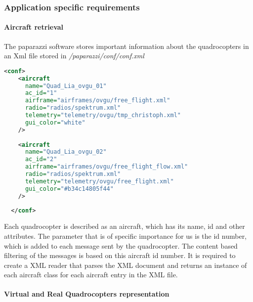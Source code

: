 \subsubsection{Application specific requirements}
\label{sec:requirementsApplication}

\paragraph{Aircraft retrieval}
The paparazzi software stores important information about the quadrocopters in an Xml file stored in \textit{/paparazzi/conf/conf.xml}

\begin{lstlisting}[basicstyle=\tiny, label={lst:AircraftXml}, language = Xml]
  <conf>
    <aircraft
      name="Quad_Lia_ovgu_01"
      ac_id="1"
      airframe="airframes/ovgu/free_flight.xml"
      radio="radios/spektrum.xml"
      telemetry="telemetry/ovgu/tmp_christoph.xml"
      gui_color="white"
    />
    
    <aircraft
      name="Quad_Lia_ovgu_02"
      ac_id="2"
      airframe="airframes/ovgu/free_flight_flow.xml"
      radio="radios/spektrum.xml"
      telemetry="telemetry/ovgu/free_flight.xml"
      gui_color="#b34c14805f44"
    />
  
  </conf>
\end{lstlisting}

Each quadrocopter is described as an aircraft, which has its name, id and other attributes. The parameter that is of specific importance for us is the id number, which is added to each message sent by the quadrocopter. The content based filtering of the messages is based on this aircraft id number. It is required to create a XML reader that parses the XML document and returns an instance of each aircraft class for each aircraft entry in the XML file.

\paragraph{Virtual and Real Quadrocopters representation}

